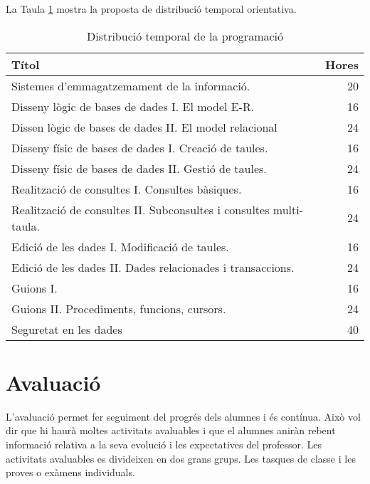 \documentclass[catalan, a4paper, 12pt, titlepage]{article}
\begin{document}
La Taula \ref{tab:distribuciotemporal} mostra la proposta de distribució temporal orientativa.

\begin{table}
	\centering
\begin{tabular}{lr}
 Títol & Hores\\
 \hline
 Sistemes d'emmagatzemament de la informació. & 20\\
 Disseny lògic de bases de dades I. El model E-R. & 16  \\
 Dissen lògic de bases de dades II. El model relacional& 24\\
 Disseny físic de bases de dades I. Creació de taules. & 16 \\
 Disseny físic de bases de dades II. Gestió de taules. & 24 \\
 Realització de consultes I. Consultes bàsiques. & 16 \\
 Realització de consultes II. Subconsultes i consultes multi-taula. & 24 \\
 Edició de les dades I. Modificació de taules. & 16\\
 Edició de les dades II. Dades relacionades i transaccions. & 24\\
 Guions I. & 16 \\
 Guions II. Procediments, funcions, cursors. & 24 \\
 Seguretat en les dades & 40 \\
\end{tabular}
	\caption{Distribució temporal de la programació} \label{tab:distribuciotemporal}
\end{table}



\section{Avaluació}

L'avaluació permet fer seguiment del progrés dels alumnes i és contínua.
Això vol dir que hi haurà moltes activitats avaluables i que el alumnes aniràn rebent informació relativa a la seva evolució i les expectatives del professor.
Les activitats avaluables es divideixen en dos grans grups. 
Les tasques de classe i les proves o exàmens individuals.
\end{document}
